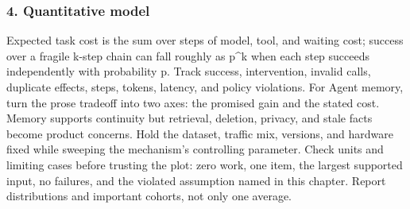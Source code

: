 \subsubsection*{4. Quantitative model}
Expected task cost is the sum over steps of model, tool, and waiting cost; success over a fragile k-step chain can fall roughly as p\textasciicircum{}k when each step succeeds independently with probability p. Track success, intervention, invalid calls, duplicate effects, steps, tokens, latency, and policy violations.
For Agent memory, turn the prose tradeoff into two axes: the promised gain and the stated cost. Memory supports continuity but retrieval, deletion, privacy, and stale facts become product concerns. Hold the dataset, traffic mix, versions, and hardware fixed while sweeping the mechanism's controlling parameter.
Check units and limiting cases before trusting the plot: zero work, one item, the largest supported input, no failures, and the violated assumption named in this chapter. Report distributions and important cohorts, not only one average.
